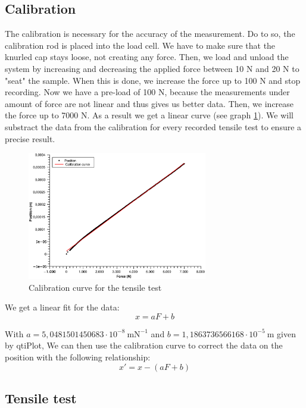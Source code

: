\documentclass{scrartcl}
\begin{document}
\subsection{Calibration}
The calibration is necessary for the accuracy of the  measurement. Do to so, the calibration rod is placed into the load cell. We have to make sure that the knurled cap stays loose, not creating any force. Then, we load and unload the system by increasing and decreasing the applied force between 10 N and 20 N to "seat" the sample. When this is done, we increase the force up to 100 N and stop recording. Now we have a pre-load of 100 N, because the measurements under amount of force are not linear and thus gives us better data. Then, we increase the force up to 7000 N. As a result we get a linear curve (see graph \ref{fig:calibration}). We will substract the data from the calibration for every recorded tensile test to ensure a precise result.
\begin{figure}[h]
    \centering
    \includegraphics[width=0.7\textwidth]{Calibration/CalibrationCurve.eps}
    \caption{Calibration curve for the tensile test}
    \label{fig:calibration}
\end{figure}

We get a linear fit for the data: 
\begin{equation}
    x = aF+b
\end{equation} 

With $a=5,0481501450683 \cdot 10^{-8} \ \text{mN}^{-1} $ and $b=1,1863736566168 \cdot 10^{-5} \ \text{m}$ given by qtiPlot, We can then use the calibration curve to correct the data on the position with the following relationship: \begin{equation}
    x' = x-(aF+b)
\end{equation}

\subsection{Tensile test}
\end{document}
